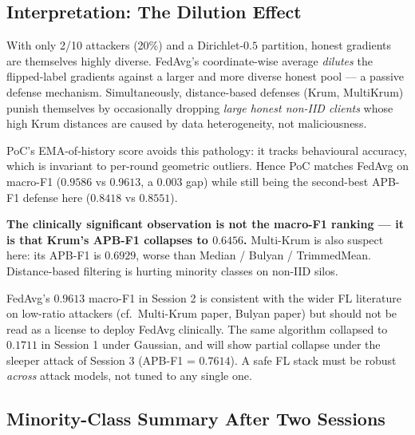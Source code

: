 \documentclass[11pt,a4paper]{article}
\begin{document}
\subsection{Interpretation: The Dilution Effect}

\begin{findingbox}
With only 2/10 attackers (20\%) and a Dirichlet-$0.5$ partition, honest
gradients are themselves highly diverse. FedAvg's coordinate-wise average
\textit{dilutes} the flipped-label gradients against a larger and more
diverse honest pool --- a passive defense mechanism. Simultaneously,
distance-based defenses (Krum, MultiKrum) punish themselves by
occasionally dropping \textit{large honest non-IID clients} whose high
Krum distances are caused by data heterogeneity, not maliciousness.

PoC's EMA-of-history score avoids this pathology: it tracks behavioural
accuracy, which is invariant to per-round geometric outliers. Hence PoC
matches FedAvg on macro-F1 ($0.9586$ vs $0.9613$, a $0.003$ gap) while
still being the second-best APB-F1 defense here ($0.8418$ vs
$0.8551$).

\textbf{The clinically significant observation is not the macro-F1 ranking
--- it is that Krum's APB-F1 collapses to $0.6456$.} Multi-Krum is also
suspect here: its APB-F1 is $0.6929$, worse than Median / Bulyan /
TrimmedMean. Distance-based filtering is hurting minority classes on
non-IID silos.
\end{findingbox}

\begin{warningbox}
FedAvg's $0.9613$ macro-F1 in Session 2 is consistent with the wider
FL literature on low-ratio attackers (cf.\ Multi-Krum paper, Bulyan
paper) but should not be read as a license to deploy FedAvg clinically.
The same algorithm collapsed to $0.1711$ in Session 1 under Gaussian, and
will show partial collapse under the sleeper attack of Session 3
(APB-F1 = $0.7614$). A safe FL stack must be robust \textit{across} attack
models, not tuned to any single one.
\end{warningbox}

\subsection{Minority-Class Summary After Two Sessions}
\end{document}
